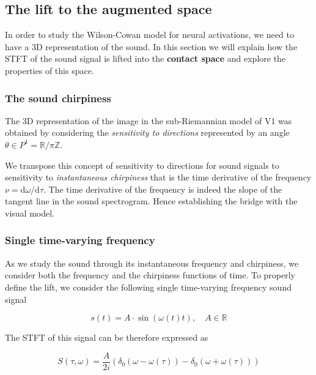 \documentclass[american,]{article}
\theoremstyle{definition}
\theoremstyle{definition}
\theoremstyle{definition}
\theoremstyle{remark}
\begin{document}
\hypertarget{the-lift-to-the-augmented-space}{%
\subsection{The lift to the augmented space}\label{the-lift-to-the-augmented-space}}

In order to study the Wilson-Cowan model for neural activations,
we need to have a 3D representation of the sound.
In this section we will explain how the STFT of the sound signal
is lifted into the \textbf{contact space} and explore the properties of this space.

\hypertarget{the-sound-chirpiness}{%
\subsubsection{The sound chirpiness}\label{the-sound-chirpiness}}

The 3D representation of the image in the sub-Riemannian model of V1
was obtained by considering the \emph{sensitivity to directions}
represented by an angle \(\theta\in P^1=\mathbb{R}/\pi\mathbb{Z}\).

We transpose this concept of sensitivity to directions
for sound signals to sensitivity to \emph{instantaneous chirpiness}
that is the time derivative of the frequency \(\nu=\mathrm{d}\omega/\mathrm{d}\tau\).
The time derivative of the frequency is indeed the slope
of the tangent line in the sound spectrogram.
Hence establishing the bridge with the visual model.

\hypertarget{single-time-varying-frequency}{%
\subsubsection{Single time-varying frequency}\label{single-time-varying-frequency}}

As we study the sound through its instantaneous frequency and chirpiness,
we consider both the frequency and the chirpiness functions of time.
To properly define the lift, we consider the following single
time-varying frequency sound signal

\begin{equation}
s(t) = A\cdot\sin(\omega(t)t),\quad A\in\mathbb{R}
\end{equation}

The STFT of this signal can be therefore expressed as

\begin{equation}
S(\tau,\omega) = \frac{A}{2i}\left(\delta_0(\omega-\omega(\tau)) - \delta_0(\omega+\omega(\tau))\right)
\end{equation}
\end{document}
